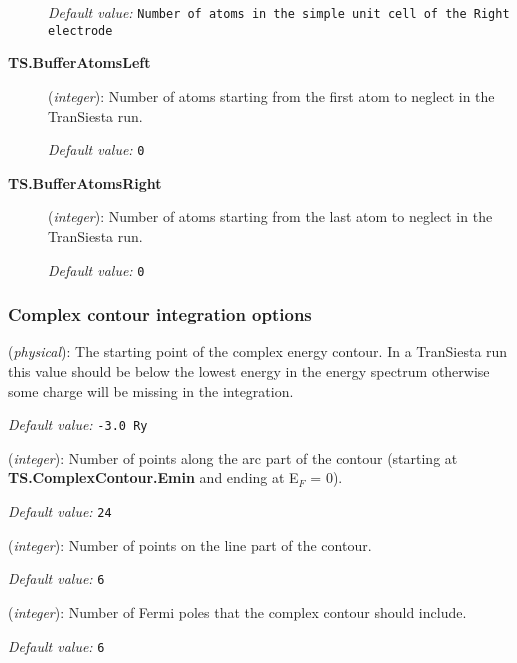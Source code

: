 \documentclass[11pt]{article}
\begin{document}
\begin{description}
{\it Default value:} {\tt Number of atoms in the simple unit cell of
  the Right electrode}

\item[{\bf TS.BufferAtomsLeft}] ({\it integer}): 
Number of atoms starting from the first atom to neglect in the  
{\sc TranSiesta} run. %

{\it Default value:} {\tt 0} 

\item[{\bf TS.BufferAtomsRight}] ({\it integer}): 
Number of atoms starting from the last atom to neglect in the  
{\sc TranSiesta} run.%

{\it Default value:} {\tt 0} 

\end{description}


\subsubsection{Complex contour integration options}

\begin{description}
    \itemsep 10pt
    \parsep 0pt

    \item[{\bf TS.ComplexContour.Emin}] ({\it physical}):
       The
      starting point of the complex energy contour. In a {\sc
        TranSiesta} run this value should be below the lowest energy
      in the energy spectrum otherwise some charge will be missing in
      the integration.

        {\it Default value:} {\tt -3.0 Ry}

    \item[{\bf TS.ComplexContour.NumCircle}] ({\it integer}): 
        Number of points along the arc part of the contour (starting at 
        {\bf TS.ComplexContour.Emin} and ending at E$_F$ = 0).

        {\it Default value:} {\tt 24}
        
    \item[{\bf TS.ComplexContour.NumLine}] ({\it integer}): 
        Number of points on the line part of the contour.

        {\it Default value:} {\tt 6}
 
    \item[{\bf TS.ComplexContour.NumPoles}] ({\it integer}): 
        Number of Fermi poles that the complex contour should include.

        {\it Default value:} {\tt 6} 
 
\end{description}
\end{document}
